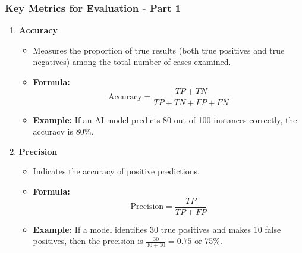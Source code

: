 \documentclass[aspectratio=169]{beamer}
\begin{document}
\begin{frame}[fragile]
    \frametitle{Key Metrics for Evaluation - Part 1}
    \begin{enumerate}
        \item \textbf{Accuracy}  
        \begin{itemize}
            \item Measures the proportion of true results (both true positives and true negatives) among the total number of cases examined.
            \item \textbf{Formula:}  
            \[
            \text{Accuracy} = \frac{TP + TN}{TP + TN + FP + FN}
            \]
            \item \textbf{Example:} If an AI model predicts 80 out of 100 instances correctly, the accuracy is 80\%.
        \end{itemize}

        \item \textbf{Precision}  
        \begin{itemize}
            \item Indicates the accuracy of positive predictions.
            \item \textbf{Formula:}  
            \[
            \text{Precision} = \frac{TP}{TP + FP}
            \]
            \item \textbf{Example:} If a model identifies 30 true positives and makes 10 false positives, then the precision is \( \frac{30}{30+10} = 0.75 \) or 75\%.
        \end{itemize}
    \end{enumerate}
\end{frame}
\end{document}
